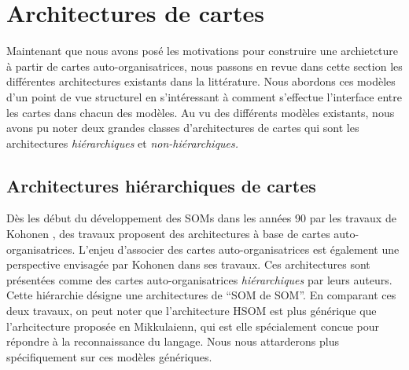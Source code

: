 \documentclass[../main]{subfiles}
\begin{document}
\section{Architectures de cartes}

Maintenant que nous avons posé les motivations pour construire une archietcture à partir de cartes auto-organisatrices, nous passons en revue dans cette section les différentes architectures existants dans la littérature. Nous abordons ces modèles d'un point de vue structurel en s'intéressant à comment s'effectue l'interface entre les cartes dans chacun des modèles. 
Au vu des différents modèles existants, nous avons pu noter deux grandes classes d'architectures de cartes qui sont les architectures \emph{hiérarchiques} et  \emph{non-hiérarchiques.}

\subsection{Architectures hiérarchiques de cartes}

Dès les début du développement des SOMs dans les années 90 par les travaux de Kohonen \cite{Kohonen1982,Kohonen1995SelfOrganizingM}, des travaux proposent des architectures à base de cartes auto-organisatrices. L'enjeu d'associer des cartes auto-organisatrices est également une perspective envisagée par Kohonen dans ses travaux.
Ces architectures sont présentées comme des cartes auto-organisatrices \emph{hiérarchiques} par leurs auteurs. 
Cette hiérarchie désigne une architectures de “SOM de SOM”.
En comparant ces deux travaux, on peut noter que l'architecture HSOM est plus générique que l'arhcitecture proposée en Mikkulaienn, qui est elle spécialement concue pour répondre à la reconnaissance du langage. Nous nous attarderons plus spécifiquement sur ces modèles génériques.
\end{document}
